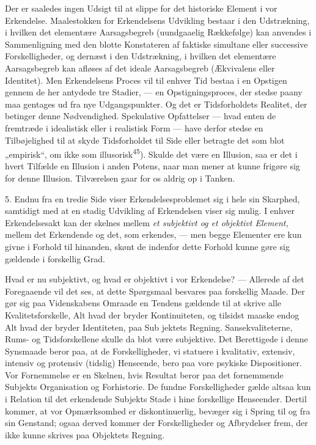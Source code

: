 \documentclass[12pt,a4paper,openany]{book}
\newcommand{\opage}[1]{\marginnote{\footnotesize\textit{[#1]}}}
\begin{document}
Der er saaledes ingen Udsigt til at slippe for det historiske Element i vor
Erkendelse. Maalestokken for Erkendelsens Udvikling bestaar i den Udstrækning,
i hvilken det elementære Aarsagsbegreb (uundgaaelig Rækkefølge) kan anvendes i
Sammenligning med den blotte Konstateren af faktiske simultane eller successive
Forskelligheder, og dernæst i den Udstrækning, i hvilken det elementære
Aarsagsbegreb kan afløses af det ideale Aarsagsbegreb (Ækvivalens eller
Identitet). Men Erkendelsens Proces vil til enhver Tid bestaa i en Opstigen
gennem de her antydede tre Stadier, --- en Opstigningsproces, der stedse paany
maa gentages ud fra nye Udgangspunkter. Og det er Tidsforholdets Realitet, der
betinger denne Nødvendighed. Spekulative Opfattelser --- hvad enten de
fremtræde i idealistisk eller i realistisk Form --- have derfor stedse en
Tilbøjelighed til at skyde Tidsforholdet til Side eller betragte det som blot
„empirisk“, om ikke som illusorisk\textsuperscript{45}). Skulde det være en
Illusion, saa er det i hvert Tilfælde en Illusion i anden Potens, naar man
mener at kunne frigøre sig for denne Illusion. Tilværelsen gaar for os aldrig
op i Tanken.

5. Endnu fra en tredie Side viser Erkendelsesproblemet sig i hele sin Skarphed,
samtidigt med at en stadig Udvikling af Erkendelsen viser sig mulig. I enhver
Erkendelsesakt kan der skelnes mellem \textit{et subjektivt og et objektivt
Element,} mellem det Erkendende og det, som erkendes, --- men begge Elementer
ere kun givne i Forhold til hinanden, skønt de indenfor dette Forhold kunne
gøre sig gældende i forskellig Grad.

Hvad er nu subjektivt, og hvad er objektivt i vor Erkendelse? --- Allerede af
det Foregaaende vil det ses, at dette Spørgsmaal besvares paa forskellig Maade.
Der gør sig paa Videnskabens Omraade en Tendens gældende til at skrive alle
Kvalitetsforskelle, Alt hvad der bryder Kontinuiteten, og tilsidst maaske endog
Alt hvad der bryder Identiteten, paa Sub%
\opage{49}jektets Regning. Sansekvaliteterne, Rums- og Tidsforskellene skulle
da blot være subjektive. Det Berettigede i denne Synsmaade beror paa, at de
Forskelligheder, vi statuere i kvalitativ, extensiv, intensiv og protensiv
(tidslig) Henseende, bero paa vore psykiske Dispositioner. Vor Fornemmelse er
en Skelnen, hvis Resultat beror paa det fornemmende Subjekts Organisation og
Forhistorie. De fundne Forskelligheder gælde altsaa kun i Relation til det
erkendende Subjekts Stade i hine forskellige Henseender. Dertil kommer, at vor
Opmærksomhed er diskontinuerlig, bevæger sig i Spring til og fra sin Genstand;
ogsaa derved kommer der Forskelligheder og Afbrydelser frem, der ikke kunne
skrives paa Objektets Regning.
\end{document}
